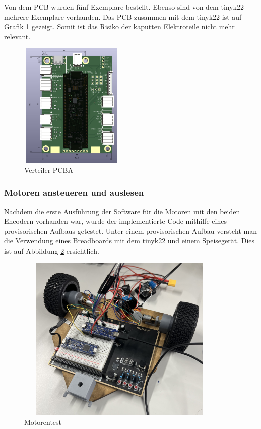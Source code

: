 Von dem PCB wurden fünf Exemplare bestellt. Ebenso sind von dem \gls{tinyk22} mehrere Exemplare vorhanden. Das PCB zusammen mit dem \gls{tinyk22} ist auf Grafik \ref{fig: Verteiler PCBA} gezeigt. Somit ist das Risiko der kaputten Elektroteile nicht mehr relevant.

\begin{figure}[H]
\centering
\includegraphics[width=5cm, height=6cm]{assets/ET/PCB/VerteilerPCB_bestueckt.png}
\caption{Verteiler PCBA}
\label{fig: Verteiler PCBA}
\end{figure}


\subsubsection{Motoren ansteueren und auslesen}

Nachdem die erste Ausführung der Software für die Motoren mit den beiden Encodern vorhanden war, wurde der implementierte Code mithilfe eines provisorischen Aufbaus getestet. Unter einem provisorischen Aufbau versteht man die Verwendung eines Breadboards mit dem \gls{tinyk22} und einem Speisegerät. Dies ist auf Abbildung \ref{fig: Motorentest} ersichtlich.

\begin{figure}[H]
\centering
\includegraphics[width=10cm, height=8cm]{assets/ET/Motoren/Motorentest.jpeg}
\caption{Motorentest}
\label{fig: Motorentest}
\end{figure}


